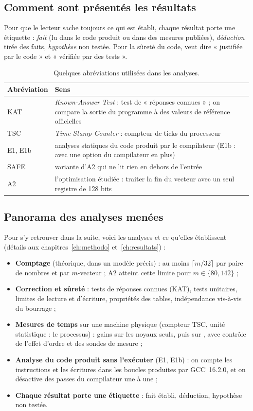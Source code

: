 \subsection{Comment sont présentés les résultats}
Pour que le lecteur sache toujours ce qui est établi, chaque résultat porte une étiquette : \F{} \emph{fait} (lu dans le code produit ou dans des mesures publiées), \I{} \emph{déduction} tirée des faits, \Hy{} \emph{hypothèse} non testée. Pour la sûreté du code, \Pc{} veut dire « justifiée par le code » et \Pe{} « vérifiée par des tests ».

\begin{table}[ht]\centering\small
\caption{Quelques abréviations utilisées dans les analyses.}\label{tab:abrev}
\begin{tabularx}{\linewidth}{@{}lX@{}}\toprule
Abréviation & Sens\\\midrule
KAT & \emph{Known-Answer Test} : test de « réponses connues » ; on compare la sortie du programme à des valeurs de référence officielles\\
TSC & \emph{Time Stamp Counter} : compteur de ticks du processeur\\
E1, E1b & analyses statiques du code produit par le compilateur (E1b : avec une option du compilateur en plus)\\
SAFE & variante d'A2 qui ne lit rien en dehors de l'entrée\\
A2 & l'optimisation étudiée : traiter la fin du vecteur avec un seul registre de 128 bits\\\bottomrule
\end{tabularx}
\end{table}

\subsection{Panorama des analyses menées}\label{sec:panorama}
Pour s'y retrouver dans la suite, voici les analyses et ce qu'elles établissent (détails aux chapitres~\ref{ch:methodo} et~\ref{ch:resultats}) :
\begin{itemize}[itemsep=1pt]
\item \textbf{Comptage} (théorique, dans un modèle précis) : au moins $\lceil m/32\rceil$ \vpshufb{} par paire de nombres et par $m$-vecteur ; A2 atteint cette limite pour $m\in\{80,142\}$ ;
\item \textbf{Correction et sûreté} : tests de réponses connues (KAT), tests unitaires, limites de lecture et d'écriture, propriétés des tables, indépendance vis-à-vis du bourrage ;
\item \textbf{Mesures de temps} sur une machine physique (compteur TSC, unité statistique : le processus) : gains sur les noyaux seuls, puis sur , avec contrôle de l'effet d'ordre et des sondes de mesure ;
\item \textbf{Analyse du code produit sans l'exécuter} (E1, E1b) : on compte les instructions et les écritures dans les boucles produites par GCC~16.2.0, et on désactive des passes du compilateur une à une ;
\item \textbf{Chaque résultat porte une étiquette} : \F{} fait établi, \I{} déduction, \Hy{} hypothèse non testée.
\end{itemize}


